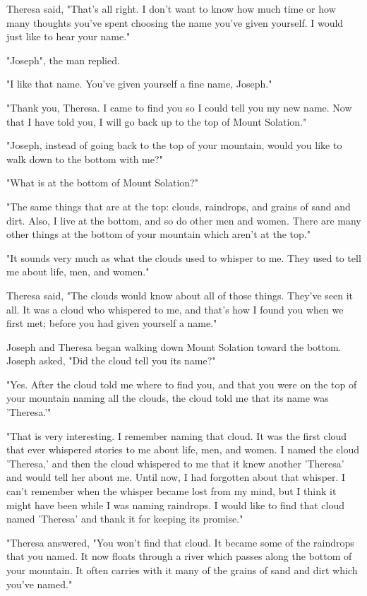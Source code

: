 Theresa said, "That's all right. I don't want to know how much time or how many thoughts you've spent choosing the name you've given yourself. I would just like to hear your name."

"Joseph", the man replied.

"I like that name. You've given yourself a fine name, Joseph."

"Thank you, Theresa. I came to find you so I could tell you my new name. Now that I have told you, I will go back up to the top of Mount Solation."

"Joseph, instead of going back to the top of your mountain, would you like to walk down to the bottom with me?"

"What is at the bottom of Mount Solation?"

"The same things that are at the top: clouds, raindrops, and grains of sand and dirt. Also, I live at the bottom, and so do other men and women. There are many other things at the bottom of your mountain which aren't at the top."

"It sounds very much as what the clouds used to whisper to me. They used to tell me about life, men, and women."

Theresa said, "The clouds would know about all of those things. They've seen it all. It was a cloud who whispered to me, and that's how I found you when we first met; before you had given yourself a name."

Joseph and Theresa began walking down Mount Solation toward the bottom. Joseph asked, "Did the cloud tell you its name?"

"Yes. After the cloud told me where to find you, and that you were on the top of your mountain naming all the clouds, the cloud told me that its name was 'Theresa.'"

"That is very interesting. I remember naming that cloud. It was the first cloud that ever whispered stories to me about life, men, and women. I named the cloud 'Theresa,' and then the cloud whispered to me that it knew another 'Theresa' and would tell her about me. Until now, I had forgotten about that whisper. I can't remember when the whisper became lost from my mind, but I think it might have been while I was naming raindrops. I would like to find that cloud named 'Theresa' and thank it for keeping its promise."

"Theresa answered, "You won't find that cloud. It became some of the raindrops that you named. It now floats through a river which passes along the bottom of your mountain. It often carries with it many of the grains of sand and dirt which you've named."

